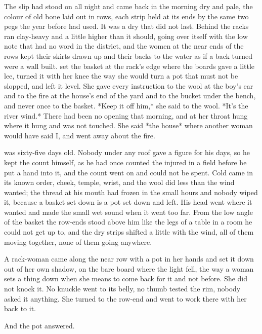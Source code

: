 
The slip had stood on  all night and came back in the morning dry and pale, the colour of old bone laid out in rows, each strip held at its ends by the same two pegs the year before had used. It was a dry that did not last. Behind the racks  ran clay-heavy and a little higher than it should, going over itself with the low note that had no word in the district, and the women at the near ends of the rows kept their skirts drawn up and their backs to the water as if a back turned were a wall built.  set the basket at the rack's edge where the boards gave a little lee, turned it with her knee the way she would turn a pot that must not be slopped, and left it level. She gave every instruction to the wool at the boy's ear and to the fire at the house's end of the yard and to the bucket under the bench, and never once to the basket. *Keep it off him,* she said to the wool. *It's the river wind.* There had been no opening that morning, and  at her throat hung where it hung and was not touched. She said *the house* where another woman would have said I, and went away about the fire.

 was sixty-five days old. Nobody under any roof gave a figure for his days, so he kept the count himself, as he had once counted the injured in a field before he put a hand into it, and the count went on and could not be spent. Cold came in its known order, cheek, temple, wrist, and the wool did less than the wind wanted; the thread at his mouth had frozen in the small hours and nobody wiped it, because a basket set down is a pot set down and left. His head went where it wanted and made the small wet sound when it went too far. From the low angle of the basket the row-ends stood above him like the legs of a table in a room he could not get up to, and the dry strips shifted a little with the wind, all of them moving together, none of them going anywhere.

A rack-woman came along the near row with a pot in her hands and set it down out of her own shadow, on the bare board where the light fell, the way a woman sets a thing down when she means to come back for it and not before. She did not knock it. No knuckle went to its belly, no thumb tested the rim, nobody asked it anything. She turned to the row-end and went to work there with her back to it.

And the pot answered.

